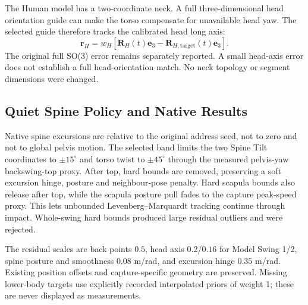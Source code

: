 \documentclass[11pt,a4paper]{article}
\begin{document}
The Human model has a two-coordinate neck. A full three-dimensional head
orientation guide can make the torso compensate for unavailable head yaw.
The selected guide therefore tracks the calibrated head long axis:
\begin{equation}
 \mathbf r_H=w_H[\mathbf R_H(t)\mathbf e_3-
                         \mathbf R_{H,\mathrm{target}}(t)\mathbf e_3].
\end{equation}
The original full SO(3) error remains separately reported. A small head-axis
error does not establish a full head-orientation match. No neck topology or
segment dimensions were changed.

\subsection{Quiet Spine Policy and Native Results}
Native spine excursions are relative to the original address seed, not to
zero and not to global pelvis motion. The selected band limits the two
Spine Tilt coordinates to $\pm15^\circ$ and torso twist to $\pm45^\circ$
through the measured pelvis-yaw backswing-top proxy. After top, hard bounds
are removed, preserving a soft excursion hinge, posture and neighbour-pose
penalty. Hard scapula bounds also release after top, while the scapula
posture pull fades to the capture peak-speed proxy. This lets unbounded
Levenberg--Marquardt tracking continue through impact. Whole-swing hard
bounds produced large residual outliers and were rejected.

The residual scales are back points $0.5$, head axis $0.2$/$0.16$ for
Model Swing 1/2, spine posture and smoothness $0.08$ m/rad, and excursion
hinge $0.35$ m/rad. Existing position offsets and capture-specific geometry
are preserved. Missing lower-body targets use explicitly recorded
interpolated priors of weight 1; these are never displayed as measurements.
\end{document}
